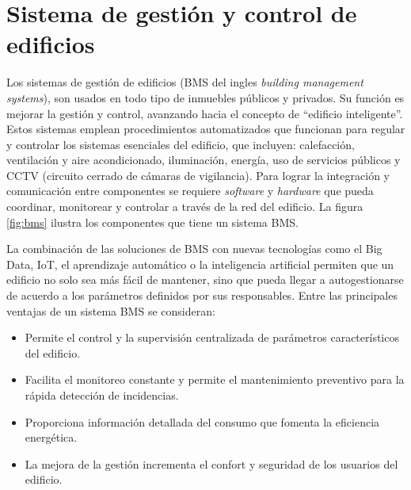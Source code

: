 





\section{Sistema de gestión y control de edificios}
Los sistemas de gestión de edificios (BMS del ingles \emph{building management systems}), son usados en todo tipo de inmuebles públicos y privados. Su función es mejorar la gestión y control, avanzando hacia el concepto de ``edificio inteligente''. Estos sistemas emplean procedimientos automatizados que funcionan para regular y controlar los sistemas esenciales del edificio, que incluyen: calefacción, ventilación y aire acondicionado, iluminación, energía, uso de servicios públicos y CCTV (circuito cerrado de cámaras de vigilancia). Para lograr la integración y comunicación entre componentes se requiere \emph{software} y \emph{hardware} que pueda coordinar, monitorear y controlar a través de la red del edificio. La figura \ref{fig:bms}  ilustra los componentes que tiene un sistema BMS.

La combinación de las soluciones de BMS con nuevas tecnologías como el Big Data, IoT, el aprendizaje automático o la inteligencia artificial permiten que un edificio no solo sea más fácil de mantener, sino que pueda llegar a autogestionarse de acuerdo a los parámetros definidos por sus responsables. Entre las principales ventajas de un sistema BMS se consideran:

\vspace{0.25cm}
\begin{itemize}
\item Permite el control y la supervisión centralizada de parámetros característicos del edificio.
\item Facilita el monitoreo constante y permite el mantenimiento preventivo para la rápida detección de incidencias.
\item Proporciona información detallada del consumo que fomenta la eficiencia energética.
\item La mejora de la gestión incrementa el confort y seguridad de los usuarios del edificio.
\end{itemize} 

